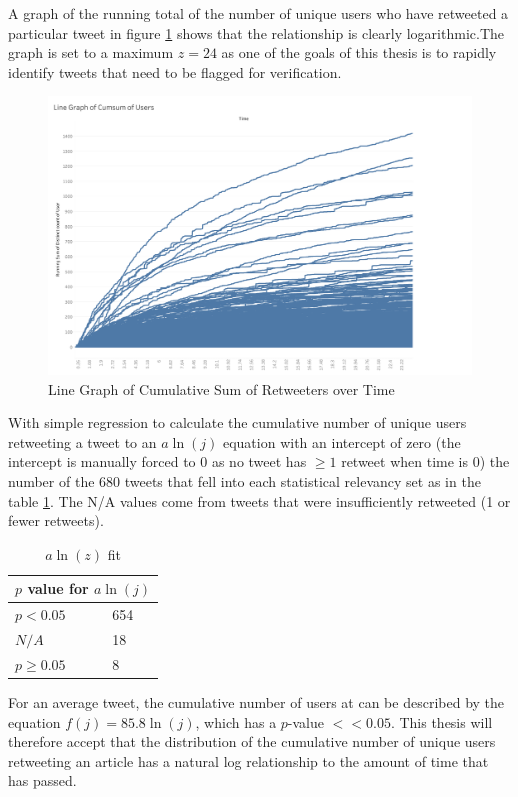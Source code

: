 \documentclass[NETN,manuscript]{stjour-new}
\begin{document}
 
A graph of the running total of the number of unique users who have retweeted a particular tweet in figure \ref{fig:Users CumSum/Time} shows that the relationship is clearly logarithmic.The graph is set to a maximum $z = 24$ as one of the goals of this thesis is to rapidly identify tweets that need to be flagged for verification.
\begin{figure}[h!]
 \centering
  \includegraphics[width=12cm]{Linegraph cumsum users.png}
  \caption{Line Graph of Cumulative Sum of Retweeters over Time}\label{fig:Users CumSum/Time}
 \end{figure}

With simple regression to calculate the cumulative number of unique users retweeting a tweet to an $a\ln(j)$ equation with an intercept of zero (the intercept is manually forced to 0 as no tweet has $\geq 1$ retweet when time is 0) the number of the 680 tweets that fell into each statistical relevancy set as in the table \ref{Natural Log Fit}. The N/A values come from tweets that were insufficiently retweeted (1 or fewer retweets).   
\begin{table}[h!]
\centering
\begin{tabular}{ |p{3cm}|p{3cm}|  }
\hline
\multicolumn{2}{|c|}{$p$ value for $a\ln(j)$} \\
\hline
$p < 0.05$  & 654\\
$N/A$ & 18 \\
$ p \geq 0.05$ & 8 \\
\hline
\end{tabular}
\caption{$a\ln(z)$ fit}
\label{Natural Log Fit}
\end{table}

For an average tweet, the cumulative number of users at can be described by the equation $f(j)=85.8\ln(j)$, which has a $p$-value $<< 0.05$. This thesis will therefore accept that the distribution of the cumulative number of unique users retweeting an article has a natural log relationship to the amount of time that has passed.
\end{document}
